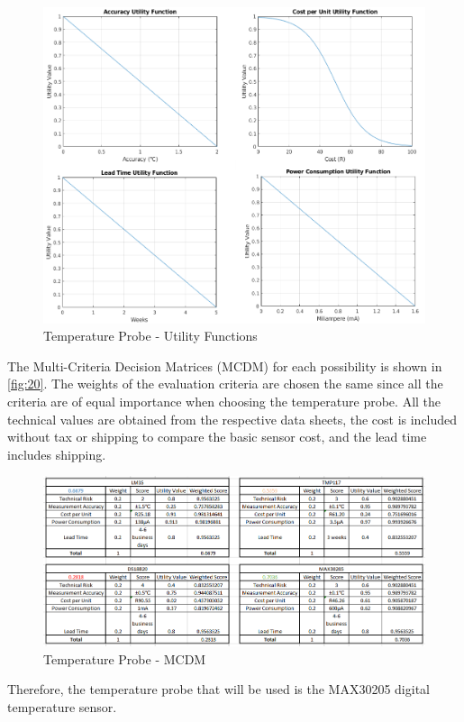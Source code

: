 \begin{figure}[H]
	\centering
	\includegraphics[scale=0.4]{img/T-Util}
	\caption{Temperature Probe - Utility Functions}
	\label{fig:18}
\end{figure}
\noindent
The Multi-Criteria Decision Matrices (MCDM) for each possibility is shown in \autoref{fig:20}. The weights of the evaluation criteria are chosen the same since all the criteria are of equal importance when choosing the temperature probe. All the technical values are obtained from the respective data sheets, the cost is included without tax or shipping to compare the basic sensor cost, and the lead time includes shipping.
\begin{figure}[H]
	\centering
	\includegraphics[scale=0.55]{img/T-MCDM}
	\caption{Temperature Probe - MCDM}
	\label{fig:20}
\end{figure}
\noindent
Therefore, the temperature probe that will be used is the MAX30205 digital temperature sensor. 

